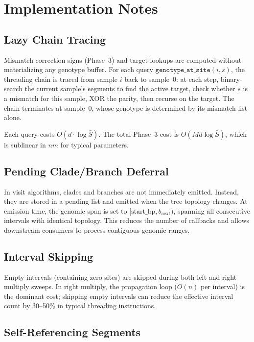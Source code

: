 \documentclass[11pt]{article}
\begin{document}
\section{Implementation Notes}

\subsection{Lazy Chain Tracing}

Mismatch correction signs (Phase~3) and target lookups are computed without
materializing any genotype buffer.  For each query
$\texttt{genotype\_at\_site}(i, s)$, the threading chain is traced from
sample $i$ back to sample~0: at each step, binary-search the current
sample's segments to find the active target, check whether $s$ is a
mismatch for this sample, XOR the parity, then recurse on the target.  The
chain terminates at sample~0, whose genotype is determined by its mismatch
list alone.

Each query costs $O(d \cdot \log \bar{S})$.  The total Phase~3 cost is
$O(Md \log \bar{S})$, which is sublinear in $nm$ for typical parameters.

\subsection{Pending Clade/Branch Deferral}

In visit algorithms, clades and branches are not immediately emitted.
Instead, they are stored in a pending list and emitted when the tree
topology changes.  At emission time, the genomic span is set to
$[\text{start\_bp}, b_\text{next})$, spanning all consecutive intervals
with identical topology.  This reduces the number of callbacks and allows
downstream consumers to process contiguous genomic ranges.

\subsection{Interval Skipping}

Empty intervals (containing zero sites) are skipped during both left and
right multiply sweeps.  In right multiply, the propagation loop ($O(n)$
per interval) is the dominant cost; skipping empty intervals can reduce
the effective interval count by 30--50\% in typical threading instructions.

\subsection{Self-Referencing Segments}
\end{document}
